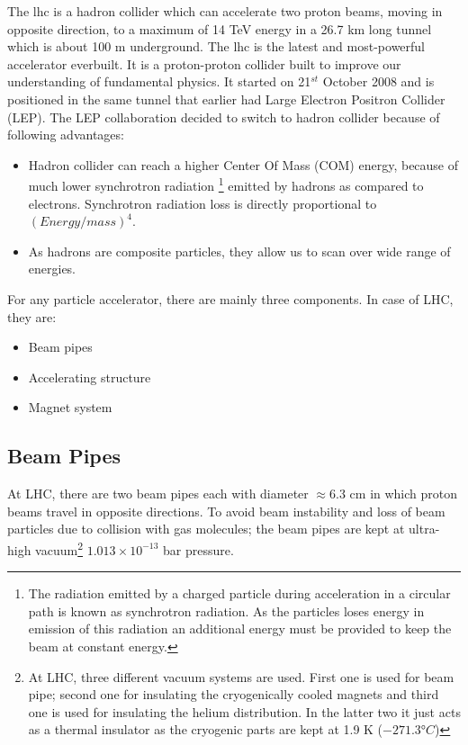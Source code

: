 The \acrshort{lhc} is  a hadron collider which can accelerate two proton beams, moving in opposite direction, to a maximum of 14 TeV energy in a 26.7 km long tunnel which is about 100 m underground. The \acrshort{lhc} is the latest and most-powerful accelerator everbuilt. It is a proton-proton collider built to improve our understanding of fundamental physics. It started on 21$^{st}$ October 2008 and is positioned in the same tunnel that earlier had Large Electron Positron Collider (LEP). The LEP collaboration decided to switch to hadron collider because of following advantages:
\begin{itemize}
    \item Hadron collider can reach a higher Center Of Mass (COM) energy, because of much lower synchrotron radiation \footnote{The radiation emitted by a charged particle during acceleration in a circular path is known as synchrotron radiation. As the particles loses energy in emission of this radiation an additional energy must be provided to keep the beam at constant energy.} emitted by hadrons as compared to electrons. Synchrotron radiation loss is directly proportional to $(Energy/mass)^4$.
    \item As hadrons are composite particles, they allow us to scan over wide range of energies.
\end{itemize}


For any particle accelerator, there are mainly three components. In case of LHC, they are:
\begin{itemize}
  \item Beam pipes
  \item Accelerating structure
  \item Magnet system
\end{itemize}

\subsection{Beam Pipes} %
\label{sub:beam_pipes}

At LHC, there are two beam pipes each with diameter $\approx$6.3 cm in which proton beams travel in opposite directions. To avoid beam instability and loss of beam particles due to collision with gas molecules; the beam pipes are kept at ultra-high vacuum\footnote{At LHC, three different vacuum systems are used. First one is used for beam pipe; second one for insulating the cryogenically cooled magnets and third one is used for insulating the helium distribution. In the latter two it just acts as a thermal insulator as the cryogenic parts are kept at 1.9 K ($\ang{-271.3}C$)} $1.013 \times 10^{-13}$ bar pressure.

